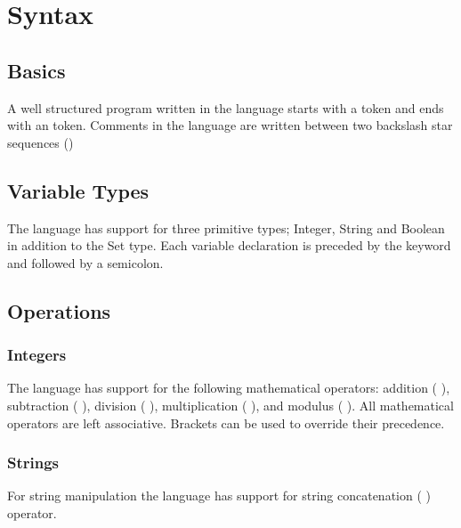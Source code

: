 \documentclass{article}
\begin{document}

\section{Syntax}
\subsection{Basics}
A well structured program written in the language starts with a \BEGIN token 
and ends with an \END token. Comments in the language are written between two 
backslash star sequences () 

\subsection{Variable Types}
The language has support for three primitive types; Integer, String and Boolean 
in addition to the Set type. Each variable declaration is preceded by the 
keyword \LET and followed by a semicolon.


\subsection{Operations}
\subsubsection{Integers}
The language has support for the following mathematical operators: addition 
( \PLUS), subtraction ( \MINUS), division ( \DIVIDE), multiplication ( \TIMES), 
and modulus ( \MOD). All mathematical operators are left associative. Brackets 
can be used to override their precedence.\\


\subsubsection{Strings}
For string manipulation the language has support for string concatenation 
( \CON) operator.\\
\end{document}
